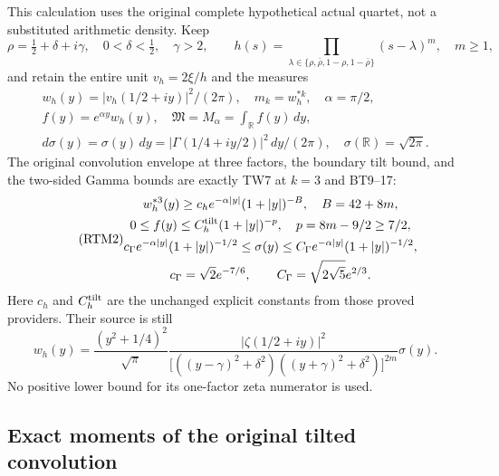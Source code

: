 \documentclass[11pt,a4paper]{article}
\begin{document}
This calculation uses the original complete hypothetical actual quartet,
not a substituted arithmetic density.  Keep
\[
 \rho=\tfrac12+\delta+i\gamma,\quad0<\delta<\tfrac12,\quad\gamma>2,
 \qquad h(s)=\prod_{\lambda\in\{\rho,\bar\rho,1-\rho,1-\bar\rho\}}
 (s-\lambda)^m,\quad m\ge1,
\]
and retain the entire unit $v_h=2\xi/h$ and the measures
\begin{equation}\tag{RTM1}
 \begin{gathered}
 w_h(y)=|v_h(1/2+iy)|^2/(2\pi),\quad m_k=w_h^{*k},\quad
 \alpha=\pi/2,\\ f(y)=e^{\alpha y}w_h(y),\quad
 \mathfrak M=M_\alpha=\int_{\mathbb R}f(y)\,dy,\\
 d\sigma(y)=\sigma(y)\,dy
 =|\Gamma(1/4+iy/2)|^2\,dy/(2\pi),\quad
 \sigma(\mathbb R)=\sqrt{2\pi}.
 \end{gathered}
\end{equation}
The original convolution envelope at three factors, the boundary tilt
bound, and the two-sided Gamma bounds are exactly TW7 at $k=3$ and
BT9--17:
\begin{equation}\tag{RTM2}
 \begin{gathered}
 w_h^{*3}(y)\ge c_h e^{-\alpha|y|}(1+|y|)^{-B},\quad B=42+8m,\\
 0\le f(y)\le C_h^{\rm tilt}(1+|y|)^{-p},\quad p=8m-9/2\ge7/2,\\
 c_\Gamma e^{-\alpha|y|}(1+|y|)^{-1/2}
 \le\sigma(y)\le C_\Gamma e^{-\alpha|y|}(1+|y|)^{-1/2},\\
 c_\Gamma=\sqrt2e^{-7/6},\qquad
 C_\Gamma=\sqrt{2\sqrt5}e^{2/3}.
 \end{gathered}
\end{equation}
Here $c_h$ and $C_h^{\rm tilt}$ are the unchanged explicit constants
from those proved providers.  Their source is still
\[
 w_h(y)=\frac{(y^2+1/4)^2}{\sqrt\pi}
 \frac{|\zeta(1/2+iy)|^2}
 {\bigl[((y-\gamma)^2+\delta^2)((y+\gamma)^2+\delta^2)\bigr]^{2m}}
 \sigma(y).
\]
No positive lower bound for its one-factor zeta numerator is used.

\subsection{Exact moments of the original tilted convolution}
\end{document}

